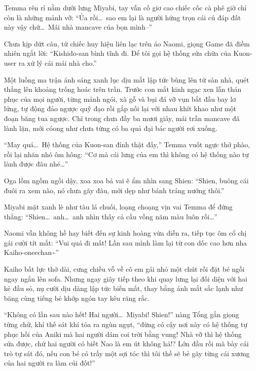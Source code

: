 \documentclass[../main.tex]{subfiles}
\begin{document}
Temma rên rỉ nằm dưới lưng Miyabi, tay vẫn cố giơ cao chiếc cốc cà phê giờ chỉ còn là những mảnh vỡ: ``Ủa rồi\dots\ sao em lại là người hứng trọn cái cú đáp đất này vậy chứ\dots\ Mái nhà mancave của bọn mình--''

Chưa kịp dứt câu, từ chiếc huy hiệu liên lạc trên áo Naomi, giọng Game đã điềm nhiên ngắt lời: ``Kishido-san bình tĩnh đi. Để tôi gọi hệ thống sửa chữa của Kuon-user ra xử lý cái mái nhà cho.''

Một luồng ma trận ánh sáng xanh lục dịu mắt lập tức bùng lên từ sàn nhà, quét thẳng lên khoảng trống hoác trên trần. Trước con mắt kinh ngạc xen lẫn thán phục của mọi người, từng mảnh ngói, xà gỗ và bụi đá vỡ vụn bắt đầu bay lơ lửng, tự động đảo ngược quỹ đạo rồi gắp nối lại với nhau khít khao như một đoạn băng tua ngược. Chỉ trong chưa đầy ba mươi giây, mái trần mancave đã lành lặn, mới cóong như chưa từng có ba quả đại bác người rơi xuống.

``May quá\dots\ Hệ thống của Kuon-san đỉnh thật đấy,'' Temma vuốt ngực thở phào, rồi lại nhăn nhó ôm hông: ``Cơ mà cái lưng của em thì không có hệ thống nào tự lành được đâu nhé\dots''

Oga lồm ngồm ngồi dậy, xoa xoa bả vai ê ẩm nhìn sang Shien: ``Shien, buông cái đuôi ra xem nào, nó chưa gãy đâu, mới dẹp như bánh tráng nướng thôi.''

Miyabi mặt xanh lè như tàu lá chuối, loạng choạng vịn vai Temma để đứng thẳng: ``Shien\dots\ anh\dots\ anh nhìn thấy cả cầu vồng năm màu luôn rồi\dots''

Naomi vẫn không hề hay biết đến sự kinh hoàng vừa diễn ra, tiếp tục ôm cổ chị gái cười tít mắt: ``Vui quá đi mất! Lần sau mình làm lại từ con dốc cao hơn nha Kaiho-oneechan\~{}''

Kaiho bất lực thở dài, cưng chiều vỗ về cô em gái nhỏ một chút rồi đặt bé ngồi ngay ngắn lên sofa. Nhưng ngay giây tiếp theo khi quay lưng lại đối diện với hai kẻ đầu sỏ, nụ cười dịu dàng lập tức biến mất, thay bằng ánh mắt sắc lạnh như băng cùng tiếng bẻ khớp ngón tay kêu răng rắc.

``Không có lần sau nào hết! Hai người\dots\ Miyabi! Shien!'' nàng Tổng gằn giọng từng chữ, khí thế sát khí tỏa ra ngùn ngụt, ``đừng có cậy nơi này có hệ thống tự phục hồi của Aniki mà hai người dám coi trời bằng vung! Nhà vỡ thì hệ thống sửa được, chứ hai người có biết Nao là em út không hả!? Lớn đầu rồi mà bày cái trò tự sát đó, nếu con bé có trầy một sợi tóc thì tôi thề sẽ bẻ gãy từng cái xương của hai người ra làm củi đốt!''
\end{document}
